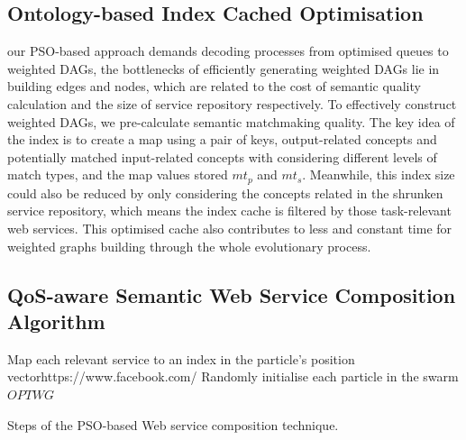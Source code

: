 \documentclass{llncs}
\begin{document}
\subsection{Ontology-based Index Cached Optimisation}\label{indexCache}
our PSO-based approach demands decoding processes from optimised queues to weighted DAGs, the bottlenecks of efficiently generating weighted DAGs lie in building edges and nodes, which are related to the cost of semantic quality calculation and the size of service repository respectively. To effectively construct weighted DAGs, we pre-calculate semantic matchmaking quality. The key idea of the index is to create a map using a pair of keys, output-related concepts and potentially matched input-related concepts with considering different levels of match types, and the map values stored $mt_{p}$ and $mt_{s}$. Meanwhile, this index size could also be reduced by only considering the concepts related in the shrunken service repository, which means the index cache is filtered by those task-relevant web services. This optimised cache also contributes to less and constant time for weighted graphs building through the whole evolutionary process.


\subsection{QoS-aware Semantic Web Service Composition Algorithm} \label{pso_algorithm}


\begin{algorithm}
 \setlength{}
 \LinesNumbered
 \SetNlSty{}{}{:}
 Map each relevant service to an index in the particle's position vector\;https://www.facebook.com/
 Randomly initialise each particle in the swarm\;
 \KwRet $OPTWG$\;
 \caption{Steps of the PSO-based Web service composition technique.}
\label{novelSteps}
\end{algorithm} 
\end{document}
